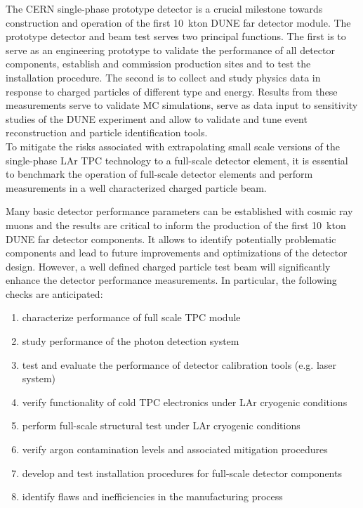 The CERN single-phase prototype detector is a crucial milestone towards construction and operation of the 
first 10~kton DUNE far detector module. The prototype detector and beam test serves two principal functions. 
The first is to serve as an engineering prototype to validate the performance of all detector components,
establish and commission production sites and to test the installation procedure. 
The second is to collect and study physics data in response to charged particles of different type and energy. 
Results from these measurements serve to validate MC simulations, serve as data input to sensitivity studies 
of the DUNE experiment  and allow to validate and tune event reconstruction and particle identification tools.\\
To mitigate the risks associated with extrapolating small scale versions of the single-phase LAr TPC technology 
to a full-scale detector element, it is essential to benchmark the operation of full-scale detector elements
and perform measurements in a well characterized charged particle beam.  

Many basic detector performance parameters can be established with cosmic ray muons and the results are critical to inform 
the production of the first 10~kton DUNE far detector components.
It allows to identify potentially problematic components and lead to future improvements and optimizations of the detector design.
However, a well defined charged particle test beam will significantly enhance the detector performance measurements.
In particular, the following checks are anticipated:
\begin{enumerate}
 \item characterize performance of full scale TPC module
 \item study performance of the photon detection system
 \item test and evaluate the performance of detector calibration tools (e.g. laser system)
  \item verify functionality of cold TPC electronics under LAr cryogenic conditions
  \item perform full-scale structural test under LAr cryogenic conditions
  \item verify argon contamination levels and associated mitigation procedures
  \item develop and test installation procedures for full-scale detector components
  \item identify flaws and inefficiencies in the manufacturing process
\end{enumerate}

